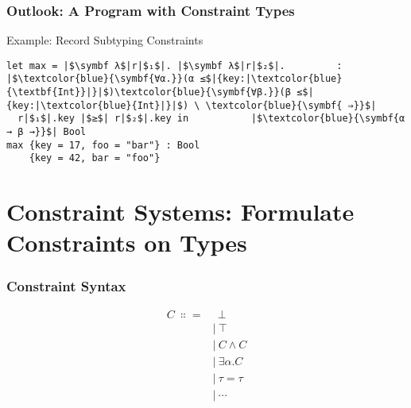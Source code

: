 \documentclass[aspectratio=169]{beamer}
\begin{document}
\begingroup
\large
\begin{frame}[fragile]
  \frametitle{Outlook: A Program with Constraint Types}
  \begin{center}
    \begin{block}{Example: Record Subtyping Constraints}
      \begin{verbatim}
let max = |$\symbf λ$|r|$₁$|. |$\symbf λ$|r|$₂$|.         : |$\textcolor{blue}{\symbf{∀α.}}(α ≤$|{key:|\textcolor{blue}{\textbf{Int}}|}|$)\textcolor{blue}{\symbf{∀β.}}(β ≤$|{key:|\textcolor{blue}{Int}|}|$) \ \textcolor{blue}{\symbf{ ⇒}}$|
  r|$₁$|.key |$≥$| r|$₂$|.key in           |$\textcolor{blue}{\symbf{α → β →}}$| Bool
max {key = 17, foo = "bar"} : Bool
    {key = 42, bar = "foo"}
          \end{verbatim}
    \end{block}
  \end{center}
\end{frame}
\endgroup

\section{Constraint Systems: Formulate Constraints on Types}

\begingroup
\Large
\begin{frame}[fragile]
  \frametitle{Constraint Syntax}
  \begin{align*}
    C \ ∷= & \ \ ⊥     \\
           & | \ ⊤     \\
           & | \ C ∧ C \\
           & | \ ∃α. C \\
           & | \ τ = τ \\
           & | \ ⋯
  \end{align*}
\end{frame}
\endgroup
\end{document}
